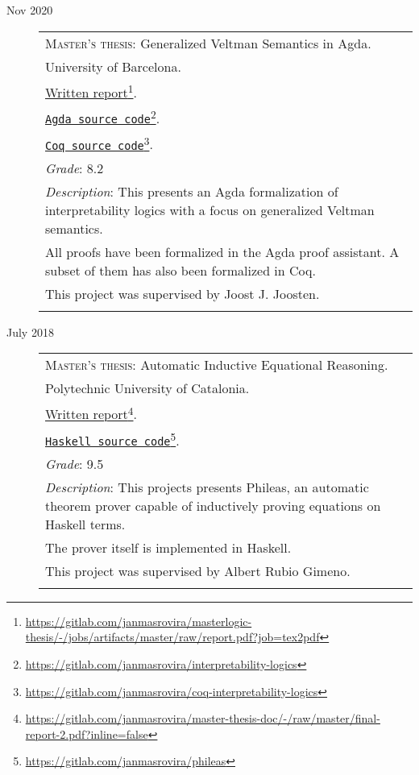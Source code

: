 \documentclass[a4paper,11pt]{article}
\newcommand{\fnlink}[2]{\href{#1}{#2}\footnote{\url{#1}}}
\begin{document}
\begin{description}
\item[Nov 2020]
\begin{minipage}{\textwidth}

  \begin{tabular}{|p{12cm}}

    \textsc{Master's thesis}: Generalized Veltman Semantics in Agda. \\
    University of Barcelona. \\
    \fnlink{https://gitlab.com/janmasrovira/masterlogic-thesis/-/jobs/artifacts/master/raw/report.pdf?job=tex2pdf}{Written report}. \\
    \fnlink{https://gitlab.com/janmasrovira/interpretability-logics}{\texttt{Agda source code}}. \\
    \fnlink{https://gitlab.com/janmasrovira/coq-interpretability-logics}{\texttt{Coq source code}}. \\
    \textit{Grade}: 8.2 \\
    \textit{Description}: This presents an Agda formalization of interpretability logics with a focus on generalized Veltman semantics.
    \\All proofs have been formalized in the Agda proof assistant. A subset of them has also been formalized in Coq.
    \\This project was supervised by Joost J. Joosten. \\
    \multicolumn{1}{c}{} \\

  \end{tabular}
\end{minipage}

\item[July 2018]
  \begin{minipage}{\textwidth}
    \begin{tabular}{|p{12cm}}
      \textsc{Master's thesis}: Automatic Inductive Equational Reasoning. \\
      Polytechnic University of Catalonia. \\
      \fnlink{https://gitlab.com/janmasrovira/master-thesis-doc/-/raw/master/final-report-2.pdf?inline=false}{Written report}. \\
      \fnlink{https://gitlab.com/janmasrovira/phileas}{\texttt{Haskell source code}}. \\
      \textit{Grade}: 9.5 \\
      \textit{Description}: This projects presents Phileas, an automatic
      theorem prover capable of inductively proving equations on Haskell
      terms.
      \\The prover itself is implemented in Haskell.
      \\This project was supervised by Albert Rubio Gimeno. \\
      \multicolumn{1}{c}{} \\

    \end{tabular}
  \end{minipage}

\end{description}
\end{document}
